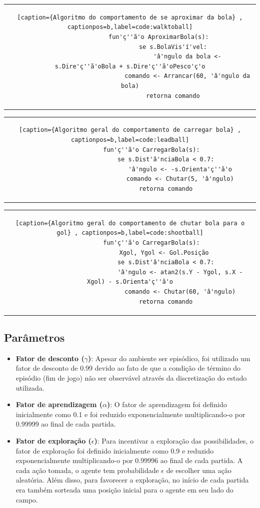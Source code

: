 	\begin{tabular}{c}
		\begin{lstlisting}[caption={Algoritmo do comportamento de se aproximar da bola} , captionpos=b,label=code:walktoball]
				fun'ç''ã'o AproximarBola(s):
						se s.BolaVis'í'vel:
								'â'ngulo da bola <- s.Dire'ç''ã'oBola + s.Dire'ç''ã'oPesco'ç'o
								comando <- Arrancar(60, 'â'ngulo da bola)
						retorna comando
		\end{lstlisting}
	\end{tabular}

	\begin{tabular}{c}
		\begin{lstlisting}[caption={Algoritmo geral do comportamento de carregar bola} , captionpos=b,label=code:leadball]
			fun'ç''ã'o CarregarBola(s):
					se s.Dist'â'nciaBola < 0.7:
							'â'ngulo <- -s.Orienta'ç''ã'o
							comando <- Chutar(5, 'â'ngulo)
					retorna comando
		\end{lstlisting}
	\end{tabular}
	
	\begin{tabular}{c}
		\begin{lstlisting}[caption={Algoritmo geral do comportamento de chutar bola para o gol} , captionpos=b,label=code:shootball]
			fun'ç''ã'o CarregarBola(s):
					Xgol, Ygol <- Gol.Posição 
					se s.Dist'â'nciaBola < 0.7:
							'â'ngulo <- atan2(s.Y - Ygol, s.X - Xgol) - s.Orienta'ç''ã'o
							comando <- Chutar(60, 'â'ngulo)
					retorna comando
		\end{lstlisting}
	\end{tabular}



\subsection{Parâmetros}
\label{subsubsec:sarsa-params}

\begin{itemize}
	\item \textbf{Fator de desconto ($\gamma$)}: Apesar do ambiente ser episódico, foi utilizado um fator de desconto de 0.99 devido ao fato de que a condição de término do episódio (fim de jogo) não ser observável através da discretização do estado utilizada.  
	
	\item \textbf{Fator de aprendizagem ($\alpha$)}: O fator de aprendizagem foi definido inicialmente como 0.1 e foi reduzido exponencialmente multiplicando-o por $0.99999$ ao final de cada partida. 
	
	\item \textbf{Fator de exploração ($\epsilon$)}: Para incentivar a exploração das possibilidades, o fator de exploração foi definido inicialmente como 0.9 e reduzido exponencialmente multiplicando-o por $0.99996$ ao final de cada partida. A cada ação tomada, o agente tem probabilidade $\epsilon$ de escolher uma ação aleatória. Além disso, para favorecer a exploração, no início de cada partida era também sorteada uma posição inicial para o agente em seu lado do campo.
\end{itemize}


